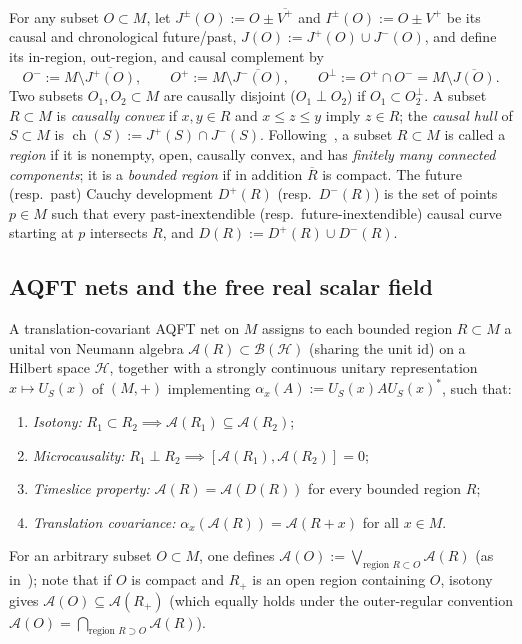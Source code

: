 \documentclass[11pt,a4paper]{article}
\theoremstyle{definition}
\theoremstyle{remark}
\newcommand{\HH}{\mathcal{H}}
\newcommand{\BB}{\mathcal{B}}
\newcommand{\Ac}{\mathcal{A}}
\newcommand{\id}{\mathrm{id}}
\newcommand{\chull}{\operatorname{ch}}
\begin{document}
For any subset $O\subset M$, let $J^\pm(O) := O \pm \overline{V^+}$ and $I^\pm(O) := O \pm V^+$ be its causal and chronological future/past, $J(O) := J^+(O)\cup J^-(O)$, and define its in-region, out-region, and causal complement by
\[
O^- := M \setminus \overline{J^+(O)}, \qquad O^+ := M \setminus \overline{J^-(O)}, \qquad O^\perp := O^+ \cap O^- = M \setminus \overline{J(O)}.
\]
Two subsets $O_1, O_2 \subset M$ are causally disjoint ($O_1 \perp O_2$) if $O_1 \subset O_2^\perp$. A subset $R\subset M$ is \emph{causally convex} if $x,y\in R$ and $x\le z\le y$ imply $z\in R$; the \emph{causal hull} of $S\subset M$ is $\chull(S) := J^+(S)\cap J^-(S)$. Following~\cite[Sec.~II.A]{Mandrysch2026}, a subset $R\subset M$ is called a \emph{region} if it is nonempty, open, causally convex, and has \emph{finitely many connected components}; it is a \emph{bounded region} if in addition $\overline{R}$ is compact. The future (resp.\ past) Cauchy development $D^+(R)$ (resp.\ $D^-(R)$) is the set of points $p\in M$ such that every past-inextendible (resp.\ future-inextendible) causal curve starting at $p$ intersects $R$, and $D(R) := D^+(R)\cup D^-(R)$.

\subsection{AQFT nets and the free real scalar field}
A translation-covariant AQFT net on $M$ assigns to each bounded region $R\subset M$ a unital von Neumann algebra $\Ac(R)\subset \BB(\HH)$ (sharing the unit $\id$) on a Hilbert space $\HH$, together with a strongly continuous unitary representation $x\mapsto U_S(x)$ of $(M,+)$ implementing $\alpha_x(A) := U_S(x) A U_S(x)^*$, such that:
\begin{enumerate}[label=\textup{(\roman*)},leftmargin=*,nosep]
\item \emph{Isotony:} $R_1\subset R_2 \implies \Ac(R_1)\subseteq\Ac(R_2)$;
\item \emph{Microcausality:} $R_1\perp R_2 \implies [\Ac(R_1),\Ac(R_2)] = 0$;
\item \emph{Timeslice property:} $\Ac(R) = \Ac(D(R))$ for every bounded region $R$;
\item \emph{Translation covariance:} $\alpha_x(\Ac(R)) = \Ac(R+x)$ for all $x\in M$.
\end{enumerate}
For an arbitrary subset $O\subset M$, one defines $\Ac(O) := \bigvee_{\text{region } R\subset O}\Ac(R)$ (as in~\cite[Sec.~II.B]{Mandrysch2026}); note that if $O$ is compact and $R_+$ is an open region containing $O$, isotony gives $\Ac(O)\subseteq\Ac(R_+)$ (which equally holds under the outer-regular convention $\Ac(O) = \bigcap_{\text{region } R\supset O}\Ac(R)$).
\end{document}
